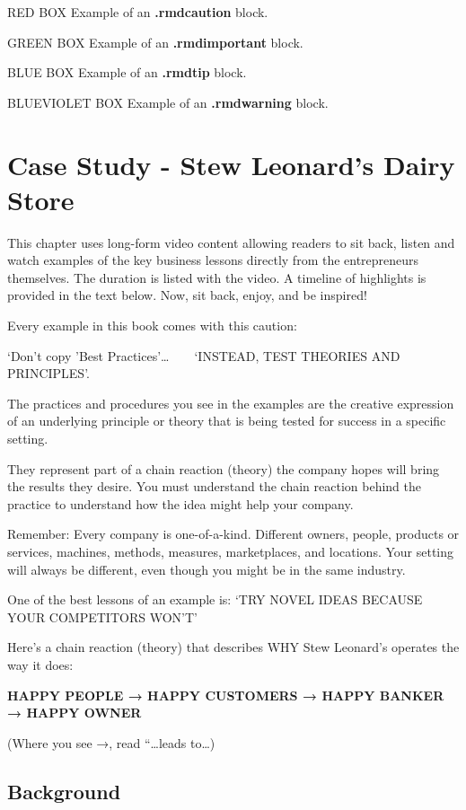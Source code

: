 \documentclass[
]{book}
\begin{document}
RED BOX Example of an \textbf{.rmdcaution} block.

GREEN BOX Example of an \textbf{.rmdimportant} block.

BLUE BOX Example of an \textbf{.rmdtip} block.

BLUEVIOLET BOX Example of an \textbf{.rmdwarning} block.

\hypertarget{case-study---stew-leonards-dairy-store}{%
\chapter{Case Study - Stew Leonard's Dairy Store}\label{case-study---stew-leonards-dairy-store}}

This chapter uses long-form video content allowing readers to sit back, listen and watch examples of the key business lessons directly from the entrepreneurs themselves. The duration is listed with the video. A timeline of highlights is provided in the text below. Now, sit back, enjoy, and be inspired!

Every example in this book comes with this caution:

{`Don't copy 'Best Practices'}\ldots{} ~ ~ {`INSTEAD, TEST THEORIES AND PRINCIPLES'}.

The practices and procedures you see in the examples are the creative expression of an underlying principle or theory that is being tested for success in a specific setting.

They represent part of a chain reaction (theory) the company hopes will bring the results they desire. You must understand the chain reaction behind the practice to understand how the idea might help your company.

Remember: Every company is one-of-a-kind. Different owners, people, products or services, machines, methods, measures, marketplaces, and locations. Your setting will always be different, even though you might be in the same industry.

One of the best lessons of an example is: {`TRY NOVEL IDEAS BECAUSE YOUR COMPETITORS WON'T'}

Here's a chain reaction (theory) that describes WHY Stew Leonard's operates the way it does:

\textbf{HAPPY PEOPLE {→} HAPPY CUSTOMERS {→} HAPPY BANKER {→} HAPPY OWNER}

(Where you see {→}, read ``\ldots leads to\ldots)

\hypertarget{background}{%
\section{Background}\label{background}}
\end{document}
